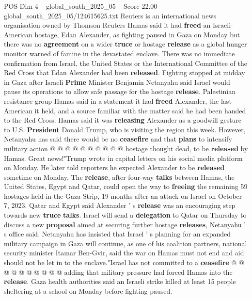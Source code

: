 \begin{textsample}{POS Dim 4 – global\_south\_2025\_05 – Score 22.00 – global\_south\_2025\_05/124615625.txt}  \label{ex:f4_pos_094}
Reuters is an international news organisation owned by Thomson Reuters Hamas said it had \textbf{freed} an Israeli-American hostage, Edan Alexander, as fighting paused in Gaza on Monday but there was no \textbf{agreement} on a wider \textbf{truce} or hostage \textbf{release} as a global hunger monitor warned of famine in the devastated enclave.
There was no immediate confirmation from Israel, the United States or the International Committee of the Red Cross that Edan Alexander had been \textbf{released}.
Fighting stopped at midday in Gaza after Israeli \textbf{Prime} Minister Benjamin Netanyahu said Israel would pause its operations to allow safe passage for the hostage \textbf{release}.
Palestinian resistance group Hamas said in a statement it had \textbf{freed} Alexander, the last American it held, and a source familiar with the matter said he had been handed to the Red Cross.
Hamas said it was \textbf{releasing} Alexander as a goodwill gesture to U.S. \textbf{President} Donald Trump, who is visiting the region this week.
However, Netanyahu has said there would be no \textbf{ceasefire} and that \textbf{plans} to intensify military action @ @ @ @ @ @ @ @ @ @ hostage thought dead, to be \textbf{released} by Hamas.
Great news!"Trump wrote in capital letters on his social media platform on Monday.
He later told reporters he expected Alexander to be \textbf{released} sometime on Monday.
The \textbf{release}, after four-way \textbf{talks} between Hamas, the United States, Egypt and Qatar, could open the way to \textbf{freeing} the remaining 59 hostages held in the Gaza Strip, 19 months after an attack on Israel on October 7, 2023.
Qatar and Egypt said Alexander ' s \textbf{release} was an encouraging step towards new \textbf{truce} \textbf{talks}.
Israel will send a \textbf{delegation} to Qatar on Thursday to discuss a new \textbf{proposal} aimed at securing further hostage \textbf{releases}, Netanyahu ' s office said.
Netanyahu has insisted that Israel ' s planning for an expanded military campaign in Gaza will continue, as one of his coalition partners, national security minister Itamar Ben-Gvir, said the war on Hamas must not end and aid should not be let in to the enclave."Israel has not committed to a \textbf{ceasefire} @ @ @ @ @ @ @ @ @ @ adding that military pressure had forced Hamas into the \textbf{release}.
Gaza health authorities said an Israeli strike killed at least 15 people sheltering at a school on Monday before fighting paused.

\end{textsample}
